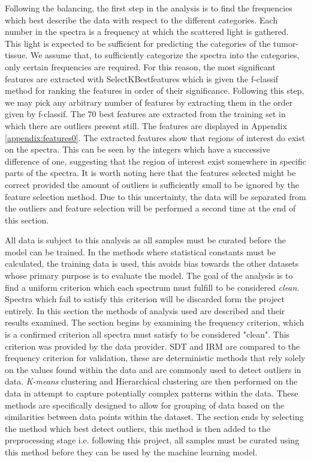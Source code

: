 Following the balancing, the first step in the analysis is to find the frequencies which best describe the data with respect to the different categories. Each number in the spectra is a frequency at which the scattered light is gathered. This light is expected to be sufficient for predicting the categories of the tumor-tissue. We assume that, to sufficiently categorize the spectra into the categories, only certain frequencies are required. For this reason, the most significant features are extracted with SelectKBestfeatures \cite{scikit} which is given the f-classif method for ranking the features in order of their significance. Following this step, we may pick any arbitrary number of features by extracting them in the order given by f-classif. The $70$ best features are extracted from the training set in which there are outliers present still. The features are displayed in Appendix \ref{appendix:features0}. The extracted features show that regions of interest do exist on the spectra. This can be seen by the integers which have a successive difference of one, suggesting that the region of interest exist somewhere in specific parts of the spectra. It is worth noting here that the features selected might be correct provided the amount of outliers is sufficiently small to be ignored by the feature selection method. Due to this uncertainty, the data will be separated from the outliers and feature selection will be performed a second time at the end of this section.

All data is subject to this analysis as all samples must be curated before the model can be trained. In the methods where statistical constants must be calculated, the training data is used, this avoids bias towards the other datasets whose primary purpose is to evaluate the model. The goal of the analysis is to find a uniform criterion which each spectrum must fulfill to be considered \textit{clean}. Spectra which fail to satisfy this criterion will be discarded form the project entirely. In this section the methods of analysis used are described and their results examined. The section begins by examining the frequency criterion, which is a confirmed criterion all spectra must satisfy to be considered "clean". This criterion was provided by the data provider. SDT and IRM are compared to the frequency criterion for validation, these are deterministic methods that rely solely on the values found within the data and are commonly used to detect outliers in data. \textit{K-means} clustering and Hierarchical clustering are then performed on the data in attempt to capture potentially complex patterns within the data. These methods are specifically designed to allow for grouping of data based on the similarities between data points within the dataset. The section ends by selecting the method which best detect outliers, this method is then added to the preprocessing stage i.e. following this project, all samples must be curated using this method before they can be used by the machine learning model. 

